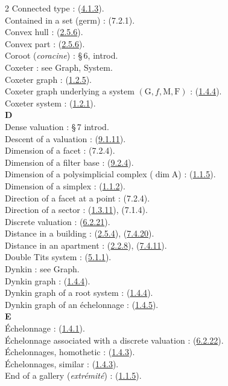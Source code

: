 \documentclass[12pt,a4paper,oneside,english]{smfart}
\newcommand{\btref}[1]{\hyperlink{bt:#1}{#1}}
\theoremstyle{definition}
\theoremstyle{bt}
\begin{document}
\begin{multicols}{2}
Connected type : (\btref{4.1.3}).\\
Contained in a set (germ) : (7.2.1).\\
Convex hull : (\btref{2.5.6}).\\
Convex part : (\btref{2.5.6}).\\
Coroot (\emph{coracine}) : \S\,6, introd.\\
Coxeter : see Graph, System.\\
Coxeter graph : (\btref{1.2.5}).\\
Coxeter graph underlying a system $(\mathrm{G},f,\mathrm{M},\mathrm{F})$ : (\btref{1.4.4}).\\
Coxeter system : (\btref{1.2.1}).\\
\textbf{D}\\
Dense valuation : \S\,7 introd.\\
Descent of a valuation : (\btref{9.1.11}).\\
Dimension of a facet : (7.2.4).\\
Dimension of a filter base : (\btref{9.2.4}).\\
Dimension of a polysimplicial complex ($\dim \mathrm{A}$) : (\btref{1.1.5}).\\
Dimension of a simplex : (\btref{1.1.2}).\\
Direction of a facet at a point : (7.2.4).\\
Direction of a sector : (\btref{1.3.11}), (7.1.4).\\
Discrete valuation : (\btref{6.2.21}).\\
Distance in a building : (\btref{2.5.4}), (\btref{7.4.20}).\\
Distance in an apartment : (\btref{2.2.8}), (\btref{7.4.11}).\\
Double Tits system : (\btref{5.1.1}).\\
Dynkin : see Graph.\\
Dynkin graph : (\btref{1.4.4}).\\
Dynkin graph of a root system : (\btref{1.4.4}).\\
Dynkin graph of an échelonnage : (\btref{1.4.5}).\\
\textbf{E}\\
Échelonnage : (\btref{1.4.1}).\\
Échelonnage associated with a discrete valuation : (\btref{6.2.22}).\\
Échelonnages, homothetic : (\btref{1.4.3}).\\
Échelonnages, similar : (\btref{1.4.3}).\\
End of a gallery (\emph{extrémité}) : (\btref{1.1.5}).\\

\end{multicols}
\end{document}
